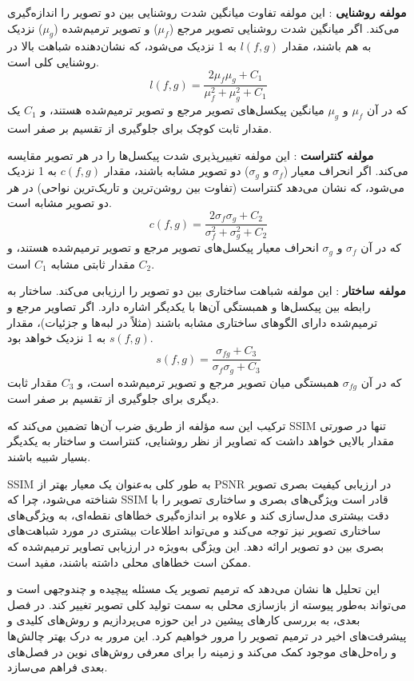 \textbf{مولفه روشنایی}%
: این مولفه تفاوت میانگین شدت روشنایی بین دو تصویر را اندازه‌گیری می‌کند. اگر میانگین شدت روشنایی تصویر مرجع ($\mu_f$) و تصویر ترمیم‌شده ($\mu_g$) نزدیک به هم باشند، مقدار $l(f, g)$ به 1 نزدیک می‌شود، که نشان‌دهنده شباهت بالا در روشنایی کلی است.
$$
l(f, g) = \frac{2\mu_f \mu_g + C_1}{\mu_f^2 + \mu_g^2 + C_1}
$$
که در آن $\mu_f$ و $\mu_g$ میانگین پیکسل‌های تصویر مرجع و تصویر ترمیم‌شده هستند، و $C_1$ یک مقدار ثابت کوچک برای جلوگیری از تقسیم بر صفر است.

\textbf{مولفه کنتراست}%
:    این مولفه تغییرپذیری شدت پیکسل‌ها را در هر تصویر مقایسه می‌کند. اگر انحراف معیار ($\sigma_f$ و $\sigma_g$) دو تصویر مشابه باشند، مقدار $c(f, g)$ به 1 نزدیک می‌شود، که نشان می‌دهد کنتراست (تفاوت بین روشن‌ترین و تاریک‌ترین نواحی) در هر دو تصویر مشابه است.
$$
c(f, g) = \frac{2\sigma_f \sigma_g + C_2}{\sigma_f^2 + \sigma_g^2 + C_2}
$$
که در آن $\sigma_f$ و $\sigma_g$ انحراف معیار پیکسل‌های تصویر مرجع و تصویر ترمیم‌شده هستند، و $C_2$ مقدار ثابتی مشابه $C_1$ است.

\textbf{مولفه ساختار}
: این مولفه شباهت ساختاری بین دو تصویر را ارزیابی می‌کند. ساختار به رابطه بین پیکسل‌ها و همبستگی آن‌ها با یکدیگر اشاره دارد. اگر تصاویر مرجع و ترمیم‌شده دارای الگوهای ساختاری مشابه باشند (مثلاً در لبه‌ها و جزئیات)، مقدار $s(f, g)$ به 1 نزدیک خواهد بود.
$$
s(f, g) = \frac{\sigma_{fg} + C_3}{\sigma_f \sigma_g + C_3}
$$
که در آن $\sigma_{fg}$ همبستگی میان تصویر مرجع و تصویر ترمیم‌شده است، و $C_3$ مقدار ثابت دیگری برای جلوگیری از تقسیم بر صفر است.

ترکیب این سه مؤلفه از طریق ضرب آن‌ها تضمین می‌کند که SSIM تنها در صورتی مقدار بالایی خواهد داشت که تصاویر از نظر روشنایی، کنتراست و ساختار به یکدیگر بسیار شبیه باشند.

SSIM
به طور کلی به‌عنوان یک معیار بهتر از PSNR در ارزیابی کیفیت بصری تصویر شناخته می‌شود، چرا که SSIM قادر است ویژگی‌های بصری و ساختاری تصویر را با دقت بیشتری مدل‌سازی کند و علاوه بر اندازه‌گیری خطاهای نقطه‌ای، به ویژگی‌های ساختاری تصویر نیز توجه می‌کند و می‌تواند اطلاعات بیشتری در مورد شباهت‌های بصری بین دو تصویر ارائه دهد. این ویژگی به‌ویژه در ارزیابی تصاویر ترمیم‌شده که ممکن است خطاهای محلی داشته باشند، مفید است.



این تحلیل ها نشان می‌دهد که ترمیم تصویر یک مسئله پیچیده و چندوجهی است و می‌تواند به‌طور پیوسته از بازسازی محلی به سمت تولید کلی تصویر تغییر کند. در فصل بعدی، به بررسی کارهای پیشین در این حوزه می‌پردازیم و روش‌های کلیدی و پیشرفت‌های اخیر در ترمیم تصویر را مرور خواهیم کرد. این مرور به درک بهتر چالش‌ها و راه‌حل‌های موجود کمک می‌کند و زمینه را برای معرفی روش‌های نوین در فصل‌های بعدی فراهم می‌سازد.
